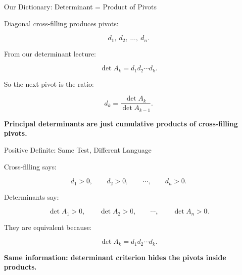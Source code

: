 \documentclass[10pt]{beamer}
\theoremstyle{definition}
\newcommand{\x}[1]{\alert{\textbf{#1}}}
\begin{document}
\begin{frame}{Our Dictionary: Determinant = Product of Pivots}

Diagonal cross-filling produces pivots:

$$
d_1,\ d_2,\ \ldots,\ d_n.
$$

\vfill

From our determinant lecture:

$$
\boxed{
\det A_k=d_1d_2\cdots d_k.
}
$$

\vfill

So the next pivot is the ratio:

$$
\boxed{
d_k=\frac{\det A_k}{\det A_{k-1}}.
}
$$

\vfill

\begin{center}
\x{Principal determinants are just cumulative products of cross-filling pivots.}
\end{center}

\end{frame}


\begin{frame}{Positive Definite: Same Test, Different Language}

Cross-filling says:

$$
d_1>0,\qquad d_2>0,\qquad \cdots,\qquad d_n>0.
$$

\vfill

Determinants say:

$$
\det A_1>0,\qquad \det A_2>0,\qquad \cdots,\qquad \det A_n>0.
$$

\vfill

They are equivalent because:

$$
\det A_k=d_1d_2\cdots d_k.
$$

\vfill

\begin{center}
\x{Same information: determinant criterion hides the pivots inside products.}
\end{center}

\end{frame}
\end{document}
